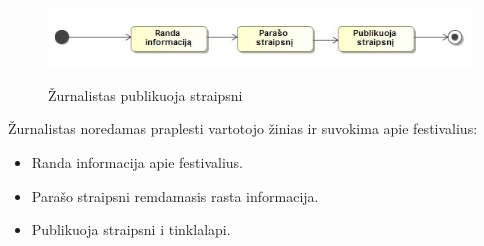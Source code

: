 ﻿\documentclass{VUMIFPSkursinis}
\begin{document}
\begin{figure}[H]
    \centering
    \includegraphics[scale=0.7]{img/geri/zurnalistas}
    \label{img:uml17}
	\caption{Žurnalistas publikuoja straipsni}
\end{figure}

Žurnalistas noredamas praplesti vartotojo žinias ir suvokima apie festivalius:
\begin{itemize}
\item Randa informacija apie festivalius.
\item Parašo straipsni remdamasis rasta informacija.
\item Publikuoja straipsni i tinklalapi.
\end{itemize}
\end{document}
